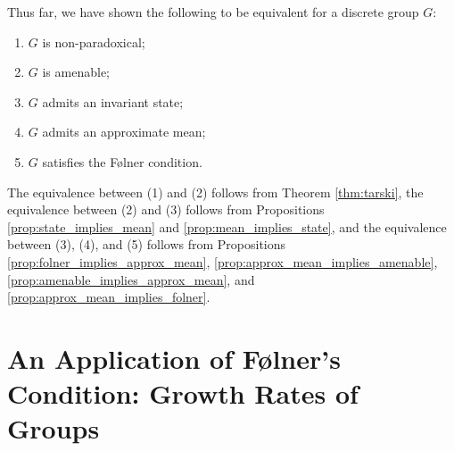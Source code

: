 Thus far, we have shown the following to be equivalent for a discrete group $G$:
\begin{enumerate}[(1)]
  \item $G$ is non-paradoxical;
  \item $G$ is amenable;
  \item $G$ admits an invariant state;
  \item $G$ admits an approximate mean;
  \item $G$ satisfies the Følner condition.
\end{enumerate}
The equivalence between (1) and (2) follows from Theorem \ref{thm:tarski}, the equivalence between (2) and (3) follows from Propositions \ref{prop:state_implies_mean} and \ref{prop:mean_implies_state}, and the equivalence between (3), (4), and (5) follows from Propositions \ref{prop:folner_implies_approx_mean}, \ref{prop:approx_mean_implies_amenable}, \ref{prop:amenable_implies_approx_mean}, and \ref{prop:approx_mean_implies_folner}.
\section{An Application of Følner's Condition: Growth Rates of Groups}%

